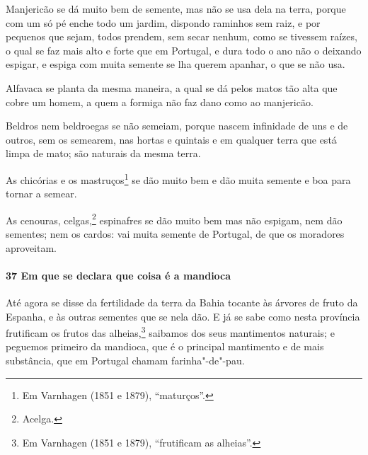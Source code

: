 \begin{linenumbers}
Manjericão se dá muito bem de semente, mas não se usa dela na terra, porque com um só pé
enche todo um jardim, dispondo raminhos sem raiz, e por pequenos que sejam, todos prendem,
sem secar nenhum, como se tivessem raízes, o qual se faz mais alto e forte que em
Portugal, e dura todo o ano não o deixando espigar, e espiga com muita semente se lha
querem apanhar, o que se não usa.

Alfavaca se planta da mesma maneira, a qual se dá pelos matos tão alta que cobre um homem,
a quem a formiga não faz dano como ao manjericão.

Beldros nem beldroegas se não semeiam, porque nascem infinidade de uns e de outros, sem os
semearem, nas hortas e quintais e em qualquer terra que está limpa de mato; são naturais
da mesma terra.

As chicórias e os mastruços\footnote{ Em Varnhagen (1851 e 1879), ``maturços''.} se dão
muito bem e dão muita semente e boa para tornar a semear.

As cenouras, celgas,\footnote{ Acelga.} espinafres se dão muito bem mas não espigam, nem
dão sementes; nem os cardos: vai muita semente de Portugal, de que os moradores
aproveitam.

\paragraph{37 Em que se declara que coisa é a mandioca}\quad
Até agora se disse da fertilidade da terra da Bahia tocante às árvores de fruto da
Espanha, e às outras sementes que se nela dão. E já se sabe como nesta província
frutificam os frutos das alheias,\footnote{ Em Varnhagen (1851 e 1879), ``frutificam as
alheias''.} saibamos dos seus mantimentos naturais; e peguemos primeiro da mandioca, que é
o principal mantimento e de mais substância, que em Portugal chamam farinha"-de"-pau.


\end{linenumbers}
